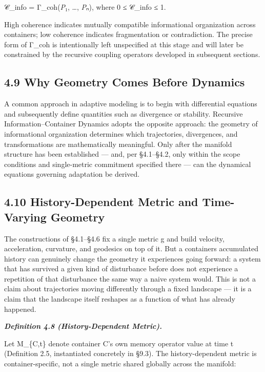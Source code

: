 \documentclass[
]{article}
\begin{document}
𝒞\_info = Γ\_coh(\emph{P}₁, \ldots, \emph{P}ₙ), where 0 ≤ 𝒞\_info ≤ 1.

High coherence indicates mutually compatible informational organization
across containers; low coherence indicates fragmentation or
contradiction. The precise form of Γ\_coh is intentionally left
unspecified at this stage and will later be constrained by the recursive
coupling operators developed in subsequent sections.

\hypertarget{why-geometry-comes-before-dynamics}{%
\subsection{4.9 Why Geometry Comes Before
Dynamics}\label{why-geometry-comes-before-dynamics}}

A common approach in adaptive modeling is to begin with differential
equations and subsequently define quantities such as divergence or
stability. Recursive Information--Container Dynamics adopts the opposite
approach: the geometry of informational organization determines which
trajectories, divergences, and transformations are mathematically
meaningful. Only after the manifold structure has been established ---
and, per §4.1--§4.2, only within the scope conditions and single-metric
commitment specified there --- can the dynamical equations governing
adaptation be derived.

\hypertarget{history-dependent-metric-and-time-varying-geometry}{%
\subsection{4.10 History-Dependent Metric and Time-Varying
Geometry}\label{history-dependent-metric-and-time-varying-geometry}}

The constructions of §4.1--§4.6 fix a single metric g and build
velocity, acceleration, curvature, and geodesics on top of it. But a
container\textquotesingle s accumulated history can genuinely change the
geometry it experiences going forward: a system that has survived a
given kind of disturbance before does not experience a repetition of
that disturbance the same way a naive system would. This is not a claim
about trajectories moving differently through a fixed landscape --- it
is a claim that the landscape itself reshapes as a function of what has
already happened.

\emph{\textbf{Definition 4.8 (History-Dependent Metric).}}

Let M\_\{C,t\} denote container C's own memory operator value at time t
(Definition 2.5, instantiated concretely in §9.3). The history-dependent
metric is container-specific, not a single metric shared globally across
the manifold:
\end{document}
